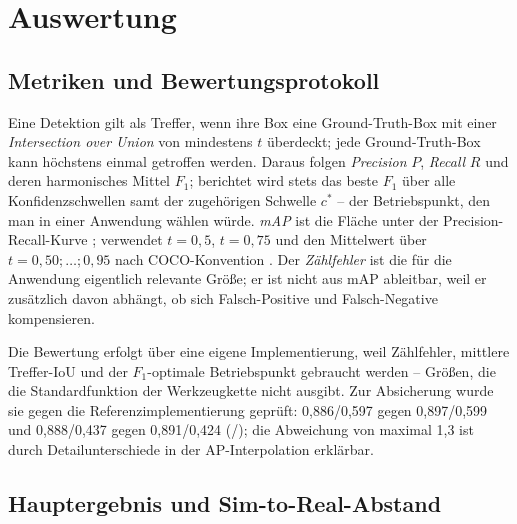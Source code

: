 \chapter{Auswertung}
\label{kap:auswertung}

\section{Metriken und Bewertungsprotokoll}
\label{sec:metriken}

Eine Detektion gilt als Treffer, wenn ihre Box eine Ground-Truth-Box mit einer
\emph{Intersection over Union} von mindestens $t$ überdeckt; jede
Ground-Truth-Box kann höchstens einmal getroffen werden. Daraus folgen
\emph{Precision} $P$, \emph{Recall} $R$ und deren harmonisches Mittel $F_1$;
berichtet wird stets das beste $F_1$ über alle Konfidenzschwellen samt der
zugehörigen Schwelle $c^*$ -- der Betriebspunkt, den man in einer Anwendung
wählen würde. \emph{mAP} ist die Fläche unter der Precision-Recall-Kurve
\parencite{everingham2010}; \mAPfifty{} verwendet $t = 0{,}5$, \mAPseven{}
$t = 0{,}75$ und \mAPall{} den Mittelwert über $t = 0{,}50; \dots; 0{,}95$ nach
COCO-Konvention \parencite{lin2014coco}. Der \emph{Zählfehler} ist die für die
Anwendung eigentlich relevante Größe; er ist nicht aus mAP ableitbar, weil er
zusätzlich davon abhängt, ob sich Falsch-Positive und Falsch-Negative
kompensieren.

Die Bewertung erfolgt über eine eigene Implementierung, weil Zählfehler, mittlere
Treffer-IoU und der $F_1$-optimale Betriebspunkt gebraucht werden -- Größen, die
die Standardfunktion der Werkzeugkette nicht ausgibt. Zur Absicherung wurde sie
gegen die Referenzimplementierung geprüft:  0,886/0,597 gegen
0,897/0,599 und  0,888/0,437 gegen 0,891/0,424
(\mAPfifty{}/\mAPall{}); die Abweichung von maximal 1,3\PP{} ist durch
Detailunterschiede in der AP-Interpolation erklärbar.

\section{Hauptergebnis und Sim-to-Real-Abstand}
\label{sec:hauptergebnis}

